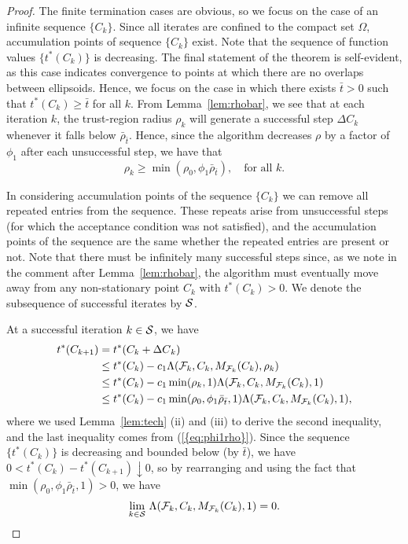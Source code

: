 \documentclass{siamltex}
\begin{document}
\begin{proof}
  The finite termination cases are obvious, so we focus on the case of
  an infinite sequence $\{ C_k \}$. Since all iterates are confined to
  the compact set $\Omega$, accumulation points of sequence $\{ C_k\}$
  exist. Note that the sequence of function values $\{ t^*(C_k)\}$ is
  decreasing. The final statement of the theorem is self-evident, as
  this case indicates convergence to points at which there are no
  overlaps between ellipsoids. Hence, we focus on the case
  in which there exists $\bar{t}>0$ such that $t^*(C_k) \ge \bar{t}$
  for all $k$.  From Lemma~\ref{lem:rhobar}, we see that at each
  iteration $k$, the trust-region radius $\rho_k$ will generate a
  successful step ${\Delta C}_k$ whenever it falls below
  $\bar{\rho}_{\bar{t}}$. Hence, since the algorithm decreases $\rho$
  by a factor of $\phi_1$ after each unsuccessful step, we have that
\begin{equation} \label{eq:phi1rho}
  \rho_k \ge \min (\rho_0, \phi_1 \bar{\rho}_{\bar{t}}), \quad
\mbox{for all $k$.}
\end{equation}

  In considering accumulation points of the sequence $\{ C_k \}$ we
  can remove all repeated entries from the sequence.  These repeats
  arise from unsuccessful steps (for which the acceptance condition
  was not satisfied), and the accumulation points of the sequence are
  the same whether the repeated entries are present or not. Note that
  there must be infinitely many successful steps since, as we note in
  the comment after Lemma~\ref{lem:rhobar}, the algorithm must
  eventually move away from any non-stationary point $C_k$ with
  $t^*(C_k)>0$. We denote the subsequence of successful iterates by
  ${{\cal S}}$.

  At a successful iteration $k \in {{\cal S}}$, we have
\begin{align*}
t^*(C_{k+1})  &= t^*(C_k + {\Delta C}_k) \\
& \le t^*(C_k) - c_1 \Lambda ({{\cal F}}_k, C_k, M_{{{\cal F}}_k}(C_k), \rho_k) \\
& \le t^*(C_k) - c_1 \min(\rho_k,1) \Lambda({{\cal F}}_k,C_k, M_{{{\cal F}}_k}(C_k), 1) \\
& \le t^*(C_k) - c_1 \min(\rho_0,\phi_1 \bar{\rho}_{\bar{t}},1) \Lambda({{\cal F}}_k,C_k, M_{{{\cal F}}_k}(C_k), 1),
\end{align*}
where we used Lemma~\ref{lem:tech} (ii) and (iii) to derive the second
inequality, and the last
inequality comes from {(\ref{{eq:phi1rho}})}.
Since the sequence $\{ t^*(C_k) \}$ is decreasing and
bounded below (by $\bar{t}$), we have $0 < t^*(C_k)-t^*(C_{k+1})
\downarrow 0$, so by rearranging  and using the
fact that $\min(\rho_0,\phi_1 \bar{\rho}_{\bar{t}},1)>0$, we have
\begin{equation} \label{eq:limlam}
\lim_{k \in {{\cal S}}} \, \Lambda({{\cal F}}_k,C_k, M_{{{\cal F}}_k}(C_k), 1) =0.
\end{equation}


\end{proof}
\end{document}
